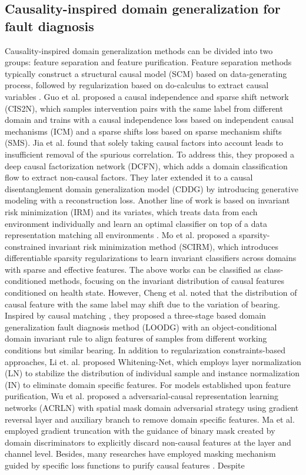 \documentclass{article}
\begin{document}
	\subsection{Causality-inspired domain generalization for fault diagnosis} 
	Causality-inspired domain generalization methods can be divided into two groups: feature separation and feature purification. Feature separation methods typically construct a structural causal model (SCM) based on data-generating process, followed by regularization based on do-calculus to extract causal variables \cite{RN30, RN26, RN31}. Guo et al. \cite{RN24} proposed a causal independence and sparse shift network (CIS2N), which samples intervention pairs with the same label from different domain and trains with a causal independence loss based on independent causal mechanisms (ICM) and a sparse shifts loss based on sparse mechanism shifts (SMS). Jia et al. \cite{RN29} found that solely taking causal factors into account leads to insufficient removal of the spurious correlation. To address this, they proposed a deep causal factorization network (DCFN), which adds a domain classification flow to extract non-causal factors. They \cite{RN11} later extended it to a causal disentanglement domain generalization model (CDDG) by introducing generative modeling with a reconstruction loss. Another line of work is based on invariant risk minimization (IRM) and its variates, which treats data from each environment individually and learn an optimal classifier on top of a data representation matching all environments \cite{2019arXiv190702893A}. Mo et al. \cite{9976035} proposed a sparsity-constrained invariant risk minimization method (SCIRM), which introduces differentiable sparsity regularizations to learn invariant classifiers across domains with sparse and effective features. The above works can be classified as class-conditioned methods, focusing on the invariant distribution of causal features conditioned on health state. However, Cheng et al. \cite{RN13} noted that the distribution of causal feature with the same label may shift due to the variation of bearing. Inspired by causal matching \cite{2020arXiv200607500M}, they proposed a three-stage based domain generalization fault diagnosis method (LOODG) with an object-conditional domain invariant rule to align features of samples from different working conditions but similar bearing. In addition to regularization constraints-based approaches, Li et. al. \cite{RN9} proposed Whitening-Net, which employs layer normalization (LN) to stabilize the distribution of individual sample and instance normalization (IN) to eliminate domain specific features. For models established upon feature purification, Wu et al. \cite{RN12} proposed a adversarial-causal representation learning networks (ACRLN) with spatial mask domain adversarial strategy using gradient reversal layer and auxiliary branch to remove domain specific features. Ma et al. \cite{RN5} employed gradient truncation with the guidance of binary mask created by domain discriminators to explicitly discard non-causal features at the layer and channel level. Besides, many researches have employed masking mechanism guided by specific loss functions to purify causal features \cite{11004069, 10816046}. Despite 
\end{document}
